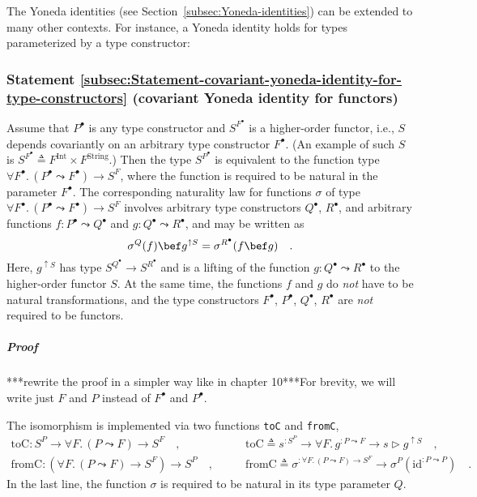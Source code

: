 The Yoneda identities (see Section~\ref{subsec:Yoneda-identities})
can be extended to many other contexts. For instance, a Yoneda identity
holds for types parameterized by a type constructor:

\subsubsection{Statement \label{subsec:Statement-covariant-yoneda-identity-for-type-constructors}\ref{subsec:Statement-covariant-yoneda-identity-for-type-constructors}
(covariant Yoneda identity for functors)}

Assume that $P^{\bullet}$ is any type constructor and $S^{F^{\bullet}}$
is a higher-order functor,
i.e., $S$ depends covariantly on an arbitrary type constructor $F^{\bullet}$.
(An example of such $S$ is $S^{F^{\bullet}}\triangleq F^{\text{Int}}\times F^{\text{String}}$.)
Then the type $S^{P^{\bullet}}$ is equivalent to the function type
$\forall F^{\bullet}.\,(P^{\bullet}\leadsto F^{\bullet})\rightarrow S^{F}$,
where the function is required to be natural in the parameter $F^{\bullet}$.
The corresponding naturality law for functions $\sigma$ of type $\forall F^{\bullet}.\,(P^{\bullet}\leadsto F^{\bullet})\rightarrow S^{F}$
involves arbitrary type constructors $Q^{\bullet}$, $R^{\bullet}$,
and arbitrary functions $f:P^{\bullet}\leadsto Q^{\bullet}$ and $g:Q^{\bullet}\leadsto R^{\bullet}$,
and may be written as
\begin{equation}
\sigma^{Q}(f)\bef g^{\uparrow S}=\sigma^{R^{\bullet}}(f\bef g)\quad.\label{eq:assumed-naturality-of-argument-sigma}
\end{equation}
Here, $g^{\uparrow S}$ has type $S^{Q^{\bullet}}\rightarrow S^{R^{\bullet}}$
and is a lifting of the function $g:Q^{\bullet}\leadsto R^{\bullet}$
to the higher-order functor $S$. At the same time, the functions
$f$ and $g$ do \emph{not} have to be natural transformations, and
the type constructors $F^{\bullet}$, $P^{\bullet}$, $Q^{\bullet}$,
$R^{\bullet}$ are \emph{not} required to be functors.

\subparagraph{Proof}

{*}{*}{*}rewrite the proof in a simpler way like in chapter 10{*}{*}{*}For
brevity, we will write just $F$ and $P$ instead of $F^{\bullet}$
and $P^{\bullet}$.

The isomorphism is implemented via two functions \lstinline!toC!
and \lstinline!fromC!,
\begin{align*}
\text{toC}:S^{P}\rightarrow\forall F.\,(P\leadsto F)\rightarrow S^{F}\quad, & \quad\quad\text{toC}\triangleq s^{:S^{P}}\rightarrow\forall F.\,g^{:P\leadsto F}\rightarrow s\triangleright g^{\uparrow S}\quad,\\
\text{fromC}:(\forall F.\,(P\leadsto F)\rightarrow S^{F})\rightarrow S^{P}\quad, & \quad\quad\text{fromC}\triangleq\sigma^{:\forall F.\,(P\leadsto F)\rightarrow S^{F}}\rightarrow\sigma^{P}(\text{id}^{:P\leadsto P})\quad.
\end{align*}
In the last line, the function $\sigma$ is required to be natural
in its type parameter $Q$.

